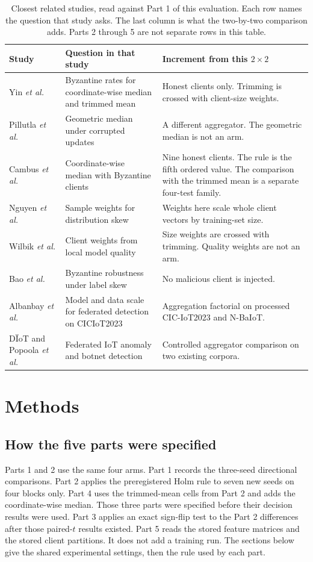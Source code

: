 \documentclass{ieeeaccess}
\begin{document}
\begin{table}[!t]
\centering
\caption{Closest related studies, read against Part 1 of this evaluation. Each row names the question that study asks. The last column is what the two-by-two comparison adds. Parts 2 through 5 are not separate rows in this table.}
\label{tab:closest}
\small
\begin{tabular}{p{2.5cm}p{6.3cm}p{7.2cm}}
\hline
Study & Question in that study & Increment from this $2\times2$ \\
\hline
Yin \emph{et al.} \cite{yin18} & Byzantine rates for coordinate-wise median and trimmed mean & Honest clients only. Trimming is crossed with client-size weights. \\
Pillutla \emph{et al.} \cite{pillutla22} & Geometric median under corrupted updates & A different aggregator. The geometric median is not an arm. \\
Cambus \emph{et al.} \cite{cambus25} & Coordinate-wise median with Byzantine clients & Nine honest clients. The rule is the fifth ordered value. The comparison with the trimmed mean is a separate four-test family. \\
Nguyen \emph{et al.} \cite{nguyen24weights} & Sample weights for distribution skew & Weights here scale whole client vectors by training-set size. \\
Wilbik \emph{et al.} \cite{wilbik23} & Client weights from local model quality & Size weights are crossed with trimming. Quality weights are not an arm. \\
Bao \emph{et al.} \cite{bao24} & Byzantine robustness under label skew & No malicious client is injected. \\
Albanbay \emph{et al.} \cite{albanbay25} & Model and data scale for federated detection on CICIoT2023 & Aggregation factorial on processed CIC-IoT2023 and N-BaIoT. \\
D{\"I}oT and Popoola \emph{et al.} \cite{nguyen19diot,popoola22} & Federated IoT anomaly and botnet detection & Controlled aggregator comparison on two existing corpora. \\
\hline
\end{tabular}
\end{table}

\section{Methods}
\subsection{How the five parts were specified}
Parts 1 and 2 use the same four arms. Part 1 records the three-seed directional comparisons. Part 2 applies the preregistered Holm rule to seven new seeds on four blocks only. Part 4 uses the trimmed-mean cells from Part 2 and adds the coordinate-wise median. Those three parts were specified before their decision results were used. Part 3 applies an exact sign-flip test to the Part 2 differences after those paired-$t$ results existed. Part 5 reads the stored feature matrices and the stored client partitions. It does not add a training run. The sections below give the shared experimental settings, then the rule used by each part.
\end{document}
